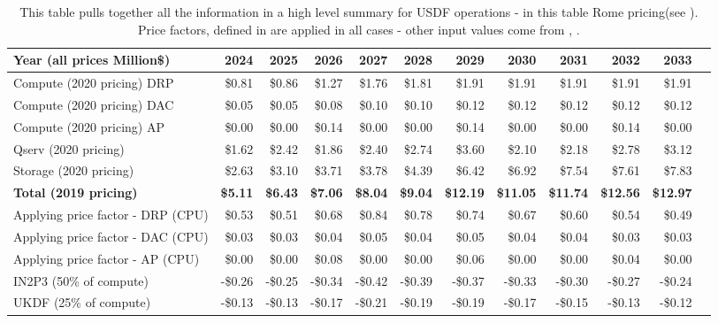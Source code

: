\tiny \begin{longtable} { |p{}  |r  |r  |r  |r  |r  |r  |r  |r  |r  |r  |r |} 
\caption{This table pulls together all the information in a high level summary for USDF operations - in this table Rome pricing(see ). Price factors, defined in  are applied in all cases - other input values come from , .
 \label{tab:opsSumUSDF}}\\ 
\hline 
\textbf{Year  (all prices Million\$)}&\textbf{2024}&\textbf{2025}&\textbf{2026}&\textbf{2027}&\textbf{2028}&\textbf{2029}&\textbf{2030}&\textbf{2031}&\textbf{2032}&\textbf{2033} \\ \hline
{Compute (2020 pricing) DRP}&{\$0.81}&{\$0.86}&{\$1.27}&{\$1.76}&{\$1.81}&{\$1.91}&{\$1.91}&{\$1.91}&{\$1.91}&{\$1.91} \\ \hline
{Compute (2020 pricing) DAC}&{\$0.05}&{\$0.05}&{\$0.08}&{\$0.10}&{\$0.10}&{\$0.12}&{\$0.12}&{\$0.12}&{\$0.12}&{\$0.12} \\ \hline
{Compute (2020 pricing) AP}&{\$0.00}&{\$0.00}&{\$0.14}&{\$0.00}&{\$0.00}&{\$0.14}&{\$0.00}&{\$0.00}&{\$0.14}&{\$0.00} \\ \hline
{Qserv (2020 pricing)}&{\$1.62}&{\$2.42}&{\$1.86}&{\$2.40}&{\$2.74}&{\$3.60}&{\$2.10}&{\$2.18}&{\$2.78}&{\$3.12} \\ \hline
{Storage (2020 pricing)}&{\$2.63}&{\$3.10}&{\$3.71}&{\$3.78}&{\$4.39}&{\$6.42}&{\$6.92}&{\$7.54}&{\$7.61}&{\$7.83} \\ \hline
\textbf{Total (2019 pricing)}&\textbf{\$5.11}&\textbf{\$6.43}&\textbf{\$7.06}&\textbf{\$8.04}&\textbf{\$9.04}&\textbf{\$12.19}&\textbf{\$11.05}&\textbf{\$11.74}&\textbf{\$12.56}&\textbf{\$12.97} \\ \hline
{Applying price factor - DRP (CPU)}&{\$0.53}&{\$0.51}&{\$0.68}&{\$0.84}&{\$0.78}&{\$0.74}&{\$0.67}&{\$0.60}&{\$0.54}&{\$0.49} \\ \hline
{Applying price factor - DAC (CPU)}&{\$0.03}&{\$0.03}&{\$0.04}&{\$0.05}&{\$0.04}&{\$0.05}&{\$0.04}&{\$0.04}&{\$0.03}&{\$0.03} \\ \hline
{Applying price factor - AP (CPU)}&{\$0.00}&{\$0.00}&{\$0.08}&{\$0.00}&{\$0.00}&{\$0.06}&{\$0.00}&{\$0.00}&{\$0.04}&{\$0.00} \\ \hline
{IN2P3 (50\% of compute)}&{-\$0.26}&{-\$0.25}&{-\$0.34}&{-\$0.42}&{-\$0.39}&{-\$0.37}&{-\$0.33}&{-\$0.30}&{-\$0.27}&{-\$0.24} \\ \hline
{UKDF (25\% of compute)}&{-\$0.13}&{-\$0.13}&{-\$0.17}&{-\$0.21}&{-\$0.19}&{-\$0.19}&{-\$0.17}&{-\$0.15}&{-\$0.13}&{-\$0.12} \\ \hline

\end{longtable}

